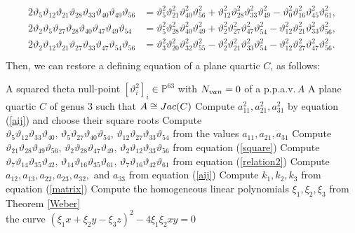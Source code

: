 \documentclass{amsart}
\theoremstyle{definition}
\theoremstyle{plain}
\begin{document}
\begin{align}\label{square}
    \begin{split}
    2\vartheta_5\vartheta_{12}\vartheta_{21}\vartheta_{28}\vartheta_{33}\vartheta_{40}\vartheta_{49}\vartheta_{56} &= \vartheta_5^2\vartheta_{21}^2\vartheta_{40}^2\vartheta_{56}^2 + \vartheta_{12}^2\vartheta_{28}^2\vartheta_{33}^2\vartheta_{49}^2 -\vartheta_0^2\vartheta_{16}^2\vartheta_{45}^2\vartheta_{61}^2,\\[-0.5mm]
    2\vartheta_2\vartheta_5\vartheta_{27}\vartheta_{28}\vartheta_{40}\vartheta_{47}\vartheta_{49}\vartheta_{54} &= \vartheta_5^2\vartheta_{28}^2\vartheta_{40}^2\vartheta_{49}^2 + \vartheta_2^2\vartheta_{27}^2\vartheta_{47}^2\vartheta_{54}^2 - \vartheta_{12}^2\vartheta_{21}^2\vartheta_{33}^2\vartheta_{56}^2,\\[-0.5mm]
    2\vartheta_2\vartheta_{12}\vartheta_{21}\vartheta_{27}\vartheta_{33}\vartheta_{47}\vartheta_{54}\vartheta_{56} &= \vartheta_3^2\vartheta_{20}^2\vartheta_{32}^2\vartheta_{55}^2 - \vartheta_2^2\vartheta_{21}^2\vartheta_{33}^2\vartheta_{54}^2 - \vartheta_{12}^2\vartheta_{27}^2\vartheta_{47}^2\vartheta_{56}^2.
    \end{split}\\[-3.6mm]\nonumber
\end{align}
Then, we can restore a defining equation of a plane quartic $C$, as follows:\vspace{-0.3mm}

\begin{algorithm}[H]
\begin{algorithmic}[1]
\caption{{\sf \ RestorePlaneQuartic}}\label{restore_quartic}
\renewcommand{\algorithmicrequire}{\textbf{Input:}}
\renewcommand{\algorithmicensure}{\textbf{Output:}}
\Require A squared theta null-point $[\vartheta_i^2]_i \in \mathbb{P}^{63}$ with $N_{\rm van} = 0$ of a p.p.a.v.\,$A$
\Ensure A plane quartic $C$ of genus $3$ such that $A \cong {\rm Jac}(C)$
\State Compute $a_{11}^2,a_{{21}}^2,a_{{31}}^2$ by equation (\ref{aij}) and choose their square roots
\State Compute $\vartheta_5\vartheta_{12}\vartheta_{33}\vartheta_{40},\,\vartheta_5\vartheta_{27}\vartheta_{40}\vartheta_{54},\,\vartheta_{12}\vartheta_{27}\vartheta_{33}\vartheta_{54}$ from the values $a_{11},a_{21},a_{31}$
\State Compute $\vartheta_{21}\vartheta_{28}\vartheta_{49}\vartheta_{56},\,\vartheta_2\vartheta_{28}\vartheta_{47}\vartheta_{49},\,\vartheta_2\vartheta_{12}\vartheta_{33}\vartheta_{56}$ from equation (\ref{square})
\State Compute $\vartheta_7\vartheta_{14}\vartheta_{35}\vartheta_{42},\,\vartheta_{14}\vartheta_{16}\vartheta_{35}\vartheta_{61},\,\vartheta_7\vartheta_{16}\vartheta_{42}\vartheta_{61}$ from equation (\ref{relation2})
\State Compute $a_{12},a_{13},a_{22},a_{23},a_{32},$ and $a_{33}$ from equation (\ref{aij})
\State Compute $k_1,k_2,k_3$ from equation (\ref{matrix})
\State Compute the homogeneous linear polynomials $\xi_1,\xi_2,\xi_3$ from Theorem \ref{Weber}\\
\Return the curve $(\xi_1x + \xi_2y - \xi_3z)^2 - 4\xi_1\xi_2xy = 0$
\end{algorithmic}
\end{algorithm}\vspace{-0.9mm}
\end{document}
